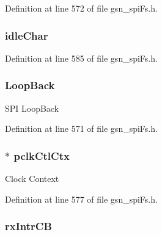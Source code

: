 Definition at line 572 of file gsn\_\-spiFs.h.

\hypertarget{a00233_abf7d1a3fd39bc4650832af3d1f22a59d}{
\subsubsection[{idleChar}]{ {\bf idleChar}}}
\label{a00233_abf7d1a3fd39bc4650832af3d1f22a59d}


Definition at line 585 of file gsn\_\-spiFs.h.

\hypertarget{a00233_a25824ede1b0ab5fe6fbf7564e6ca053c}{
\subsubsection[{LoopBack}]{ {\bf LoopBack}}}
\label{a00233_a25824ede1b0ab5fe6fbf7564e6ca053c}
SPI LoopBack 

Definition at line 571 of file gsn\_\-spiFs.h.

\hypertarget{a00233_a87fd9dda5636bd71a412693b96fed177}{
\subsubsection[{pclkCtlCtx}]{$\ast$ {\bf pclkCtlCtx}}}
\label{a00233_a87fd9dda5636bd71a412693b96fed177}
Clock Context 

Definition at line 577 of file gsn\_\-spiFs.h.

\hypertarget{a00233_aec97c6dc1aa53452aa2e39aa1f1ff89f}{
\subsubsection[{rxIntrCB}]{ {\bf rxIntrCB}}}
\label{a00233_aec97c6dc1aa53452aa2e39aa1f1ff89f}


